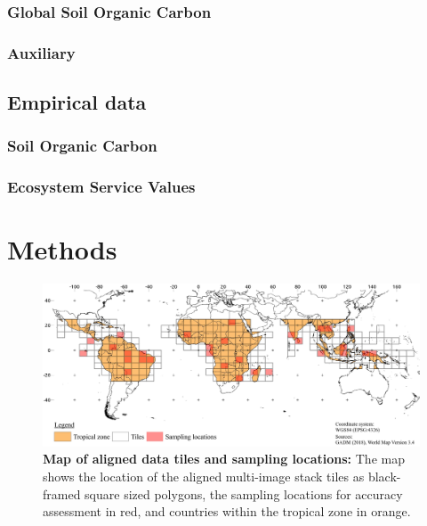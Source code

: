 		\subsubsection{Global Soil Organic Carbon}
			\lipsum[1-2]

		\subsubsection{Auxiliary}
			\lipsum[1-2]

	\subsection{Empirical data}
		\subsubsection{Soil Organic Carbon}
			\lipsum[1-2]

		\subsubsection{Ecosystem Service Values}
			\lipsum[1-2]


\section{Methods}
\label{sec:methods}
	\begin{figure}[ht]
		\centering
		\includegraphics[scale=.97]{img/method_overview_frameless}
		\caption[Map of aligned data tiles and sampling locations]{\textbf{Map of aligned data tiles and sampling locations:} The map shows the location of the aligned multi-image stack tiles as black-framed square sized polygons, the sampling locations for accuracy assessment in red, and countries within the tropical zone in orange.}
		\label{fig:processing}
	\end{figure}

